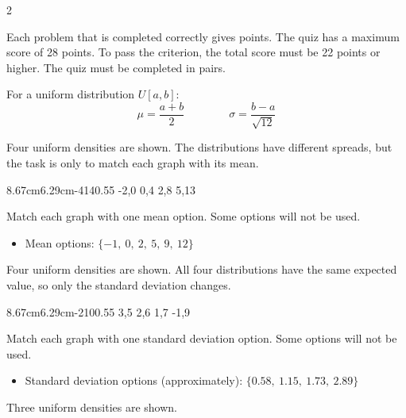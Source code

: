 	\begin{multicols}{2}
		
		\vspace{-0.35cm}
		
		Each problem that is completed correctly gives points. The quiz has a maximum score of 28 points. To pass the criterion, the total score must be 22 points or higher. The quiz must be completed in pairs.
		
		\vspace{-0.35cm}
		For a uniform distribution $U[a,b]$:
		\[
		\mu=\frac{a+b}{2}
		\qquad \qquad
		\sigma=\frac{b-a}{\sqrt{12}}
		\]
		
		\vspace{-0.35cm}
		Four uniform densities are shown. The distributions have different spreads, but the task is only to match each graph with its mean.
		
		\vspace{-0.7cm}
		\UniformFourGraph
		{8.67cm}{6.29cm}{-4}{14}{0.55}
		{-2,0}
		{0,4}
		{2,8}
		{5,13}
		
		Match each graph with one mean option. Some options will not be used.
		\begin{itemize}
			\item Mean options: $\{-1,\ 0,\ 2,\ 5, \ 9,\ 12\}$
		\end{itemize}
		
		\vspace{-0.35cm}
		Four uniform densities are shown. All four distributions have the same expected value, so only the standard deviation changes.
		
		\vspace{-0.7cm}
		\UniformFourGraph
		{8.67cm}{6.29cm}{-2}{10}{0.55}
		{3,5}
		{2,6}
		{1,7}
		{-1,9}
		
		Match each graph with one standard deviation option. Some options will not be used.
		\begin{itemize}
			\item Standard deviation options (approximately): $\{0.58,\ 1.15,\ 1.73,\ 2.89\}$
		\end{itemize}
		
		\vspace{-0.35cm}
		Three uniform densities are shown.
		

\end{multicols}
